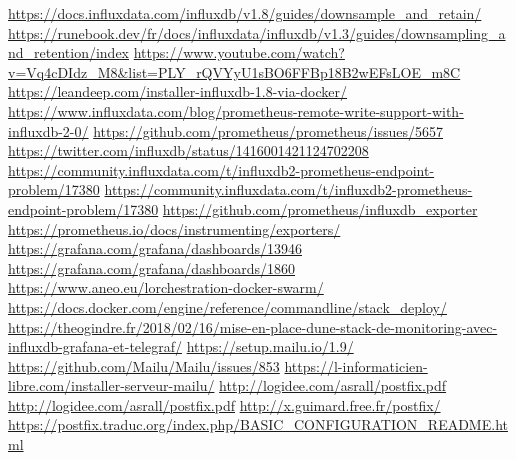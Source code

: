 \documentclass[oneside,12pt]{report}
\begin{document}
\begin{flushleft}
\url{https://docs.influxdata.com/influxdb/v1.8/guides/downsample_and_retain/}\newline
\url{https://runebook.dev/fr/docs/influxdata/influxdb/v1.3/guides/downsampling_and_retention/index}\newline
\url{https://www.youtube.com/watch?v=Vq4cDIdz_M8&list=PLY_rQVYyU1sBO6FFBp18B2wEFsLOE_m8C}\newline
\url{https://leandeep.com/installer-influxdb-1.8-via-docker/}\newline
\url{https://www.influxdata.com/blog/prometheus-remote-write-support-with-influxdb-2-0/}\newline
\url{https://github.com/prometheus/prometheus/issues/5657}\newline
\url{https://twitter.com/influxdb/status/1416001421124702208}\newline
\url{https://community.influxdata.com/t/influxdb2-prometheus-endpoint-problem/17380}\newline
\url{https://community.influxdata.com/t/influxdb2-prometheus-endpoint-problem/17380}\newline
\url{https://github.com/prometheus/influxdb_exporter}\newline
\url{https://prometheus.io/docs/instrumenting/exporters/}\newline
\url{https://grafana.com/grafana/dashboards/13946}\newline
\url{https://grafana.com/grafana/dashboards/1860}\newline
\url{https://www.aneo.eu/lorchestration-docker-swarm/}\newline
\url{https://docs.docker.com/engine/reference/commandline/stack_deploy/}\newline
\url{https://theogindre.fr/2018/02/16/mise-en-place-dune-stack-de-monitoring-avec-influxdb-grafana-et-telegraf/}\newline
\url{https://setup.mailu.io/1.9/}\newline
\url{https://github.com/Mailu/Mailu/issues/853}\newline
\url{https://l-informaticien-libre.com/installer-serveur-mailu/}\newline
\url{http://logidee.com/asrall/postfix.pdf}\newline
\url{http://logidee.com/asrall/postfix.pdf}\newline
\url{http://x.guimard.free.fr/postfix/}\newline
\url{https://postfix.traduc.org/index.php/BASIC_CONFIGURATION_README.html}\newline

\end{flushleft}
\end{document}
